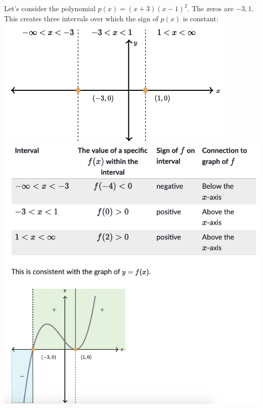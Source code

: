 \documentclass{book}
\begin{document}
	Let's consider the polynomial $p(x) = (x+3)(x-1)^2$. The zeros are $-3,1$. This creates three intervals over which the sign of $p(x)$ is constant:
	\\
	
	\includegraphics[scale=0.5]{pinterval2} \\
	
	\includegraphics[scale=0.40]{pinterval3} \\
	
\end{document}
